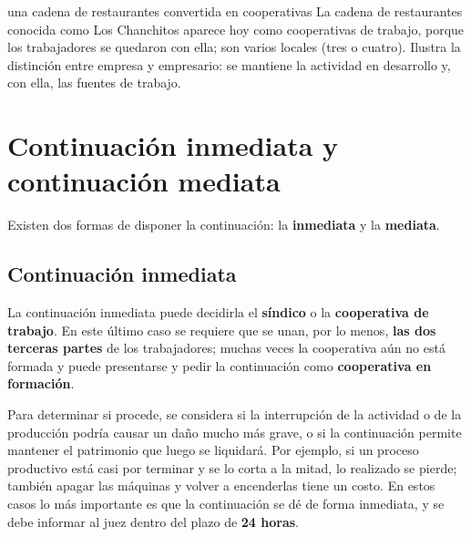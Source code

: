 \documentclass[12pt,oneside]{book}
\begin{document}
\begin{example}{una cadena de restaurantes convertida en cooperativas}
La cadena de restaurantes conocida como Los Chanchitos aparece hoy como cooperativas de trabajo, porque los trabajadores se quedaron con ella; son varios locales (tres o cuatro). Ilustra la distinción entre empresa y empresario: se mantiene la actividad en desarrollo y, con ella, las fuentes de trabajo.
\end{example}

\section{Continuación inmediata y continuación mediata}

Existen dos formas de disponer la continuación: la \textbf{inmediata} y la \textbf{mediata}.

\subsection{Continuación inmediata}

La continuación inmediata puede decidirla el \textbf{síndico} o la \textbf{cooperativa de trabajo}. En este último caso se requiere que se unan, por lo menos, \textbf{las dos terceras partes} de los trabajadores; muchas veces la cooperativa aún no está formada y puede presentarse y pedir la continuación como \textbf{cooperativa en formación}.

Para determinar si procede, se considera si la interrupción de la actividad o de la producción podría causar un daño mucho más grave, o si la continuación permite mantener el patrimonio que luego se liquidará. Por ejemplo, si un proceso productivo está casi por terminar y se lo corta a la mitad, lo realizado se pierde; también apagar las máquinas y volver a encenderlas tiene un costo. En estos casos lo más importante es que la continuación se dé de forma inmediata, y se debe informar al juez dentro del plazo de \textbf{24 horas}.
\end{document}
